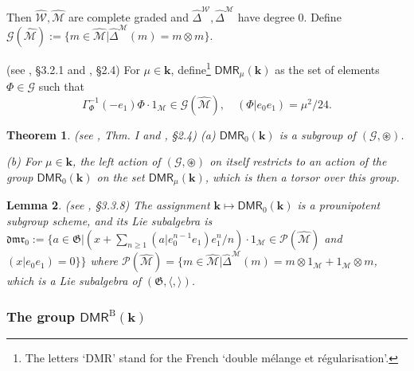 \documentclass[10pt]{amsart}
\newtheorem{thm}{Theorem}[section]
\newtheorem{lem}[thm]{Lemma}
\numberwithin{equation}{subsection}
\begin{document}
Then $\hat{\mathcal W},\hat{\mathcal M}$ are complete graded and
$\hat\Delta^{\mathcal W},\hat\Delta^{\mathcal M}$ have degree 0. 
Define $\mathcal G(\hat{\mathcal M}):=\{m\in \hat{\mathcal M}|\hat\Delta^{\mathcal M}(m)=m\otimes m\}$. 

\begin{defn} (see \cite{R}, \S3.2.1 and \cite{EF2}, \S2.4)
For $\mu\in\mathbf k$, define\footnote{The letters `DMR' stand for the French 
`double mélange et régularisation'.} $\mathsf{DMR}_\mu(\mathbf k)$ as the set of elements 
$\Phi\in \mathcal G$ such that 
$$
\Gamma_\Phi^{-1}(-e_1)\Phi\cdot 1_{\mathcal M}\in\mathcal G(\hat{\mathcal M}),\quad (\Phi|e_0e_1)=\mu^2/24. 
$$ 
\end{defn}

\begin{thm} \label{thm:racinet}
(see \cite{R}, Thm. I and \cite{EF2}, \S2.4)
    (a) $\mathsf{DMR}_0(\mathbf k)$ is a subgroup of $(\mathcal G,\circledast)$. 

    (b) For $\mu\in\mathbf k$, the left action of $(\mathcal G,\circledast)$ on itself restricts 
    to an action of the group $\mathsf{DMR}_0(\mathbf k)$ on the set $\mathsf{DMR}_\mu(\mathbf k)$, 
    which is then a torsor over this group. 
\end{thm}

\begin{lem} (see \cite{R}, \S3.3.8)
    The assignment $\mathbf k\mapsto \mathsf{DMR}_0(\mathbf k)$ is a prounipotent subgroup scheme, and its Lie subalgebra 
    is $\mathfrak{dmr}_0:=\{a\in\mathfrak G|(x+\sum_{n\geq1}(a|e_0^{n-1}e_1)e_1^n/n)\cdot 1_{\mathcal M}\in
    \mathcal P(\hat{\mathcal M})$ 
    and $(x|e_0e_1)=0\}\}$ where $\mathcal P(\hat{\mathcal M})
    =\{m\in \hat{\mathcal M}|\hat\Delta^{\mathcal M}(m)=m\otimes1_{\mathcal M}+1_{\mathcal M}\otimes m$, which is a Lie subalgebra
    of $(\mathfrak G,\langle,\rangle)$. 
\end{lem}
 
\subsubsection{The group $\mathsf{DMR}^{\mathrm B}(\mathbf k)$}
\end{document}
